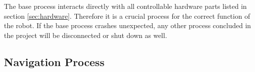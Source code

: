 The base process interacts directly with all controllable hardware parts listed in section \ref{sec:hardware}. Therefore it is a crucial process for the correct function of the robot. If the base process crashes unexpected, any other process concluded in the project will be disconnected or shut down as well.\\



\subsection{Navigation Process}


